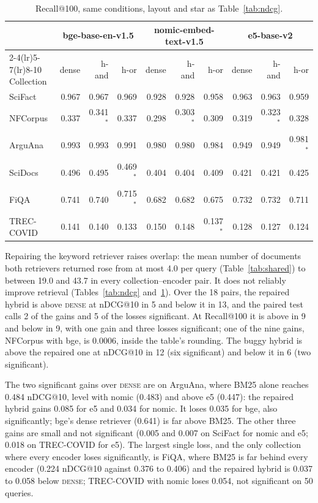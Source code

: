 \documentclass[11pt]{article}
\begin{document}
\begin{table}[h]
\centering
\small
\begin{tabular}{lrrrrrrrrr}
\toprule
 & \multicolumn{3}{c}{bge-base-en-v1.5} & \multicolumn{3}{c}{nomic-embed-text-v1.5} & \multicolumn{3}{c}{e5-base-v2} \\
\cmidrule(lr){2-4}\cmidrule(lr){5-7}\cmidrule(lr){8-10}
Collection & dense & h-and & h-or & dense & h-and & h-or & dense & h-and & h-or \\
\midrule
SciFact & 0.967 & 0.967 & 0.969 & 0.928 & 0.928 & 0.958 & 0.963 & 0.963 & 0.959 \\
NFCorpus & 0.337 & 0.341$^{*}$ & 0.337 & 0.298 & 0.303$^{*}$ & 0.309 & 0.319 & 0.323$^{*}$ & 0.328 \\
ArguAna & 0.993 & 0.993 & 0.991 & 0.980 & 0.980 & 0.984 & 0.949 & 0.949 & 0.981$^{*}$ \\
SciDocs & 0.496 & 0.495 & 0.469$^{*}$ & 0.404 & 0.404 & 0.409 & 0.421 & 0.421 & 0.425 \\
FiQA & 0.741 & 0.740 & 0.715$^{*}$ & 0.682 & 0.682 & 0.675 & 0.732 & 0.732 & 0.711 \\
TREC-COVID & 0.141 & 0.140 & 0.133 & 0.150 & 0.148 & 0.137$^{*}$ & 0.128 & 0.127 & 0.124 \\
\bottomrule
\end{tabular}
\caption{Recall@100, same conditions, layout and star as Table~\ref{tab:ndcg}.}
\label{tab:recall}
\end{table}

Repairing the keyword retriever raises overlap: the mean number of documents both retrievers returned rose from at most 4.0 per query (Table~\ref{tab:shared}) to between 19.0 and 43.7 in every collection--encoder pair. It does not reliably improve retrieval (Tables~\ref{tab:ndcg} and~\ref{tab:recall}). Over the 18 pairs, the repaired hybrid is above \textsc{dense} at nDCG@10 in 5 and below it in 13, and the paired test calls 2 of the gains and 5 of the losses significant. At Recall@100 it is above in 9 and below in 9, with one gain and three losses significant; one of the nine gains, NFCorpus with bge, is 0.0006, inside the table's rounding. The buggy hybrid is above the repaired one at nDCG@10 in 12 (six significant) and below it in 6 (two significant).

{\sloppy The two significant gains over \textsc{dense} are on ArguAna, where BM25 alone reaches 0.484 nDCG@10, level with nomic (0.483) and above e5 (0.447): the repaired hybrid gains 0.085 for e5 and 0.034 for nomic. It loses 0.035 for bge, also significantly; bge's dense retriever (0.641) is far above BM25. The other three gains are small and not significant (0.005 and 0.007 on SciFact for nomic and e5; 0.018 on TREC-COVID for e5). The largest single loss, and the only collection where every encoder loses significantly, is FiQA, where BM25 is far behind every encoder (0.224 nDCG@10 against 0.376 to 0.406) and the repaired hybrid is 0.037 to 0.058 below \textsc{dense}; TREC-COVID with nomic loses 0.054, not significant on 50 queries.\par}
\end{document}
